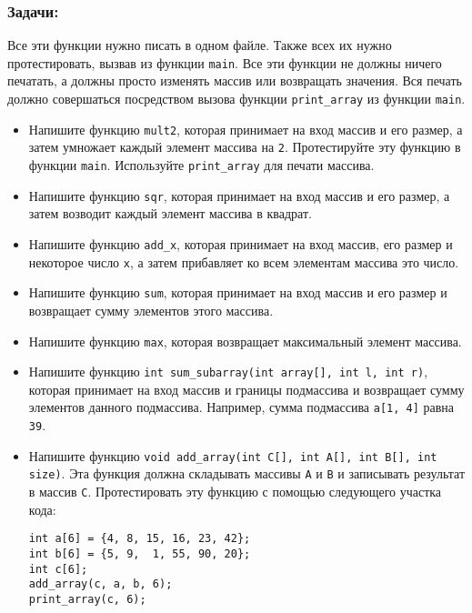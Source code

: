 \documentclass{article}
\begin{document}
\subsubsection*{Задачи:}
Все эти функции нужно писать в одном файле. Также всех их нужно протестировать, вызвав из функции \texttt{main}. Все эти функции не должны ничего печатать, а должны просто изменять массив или возвращать значения. Вся печать должно совершаться посредством вызова функции \texttt{print\_array} из функции \texttt{main}.
\begin{itemize}
\item Напишите функцию \texttt{mult2}, которая принимает на вход массив и его размер, а затем умножает каждый элемент массива на \texttt{2}. Протестируйте эту функцию в функции \texttt{main}. Используйте \texttt{print\_array} для печати массива.
\item Напишите функцию \texttt{sqr}, которая принимает на вход массив и его размер, а затем возводит каждый элемент массива в квадрат.
\item Напишите функцию \texttt{add\_x}, которая принимает на вход массив, его размер и некоторое число \texttt{x}, а затем прибавляет ко всем элементам массива это число.
\item Напишите функцию \texttt{sum}, которая принимает на вход массив и его размер и возвращает сумму элементов этого массива.
\item Напишите функцию \texttt{max}, которая возвращает максимальный элемент массива.
\item Напишите функцию \texttt{int sum\_subarray(int array[], int l, int r)}, которая принимает на вход массив и границы подмассива и возвращает сумму элементов данного подмассива. Например, сумма подмассива \texttt{a[1, 4]} равна \texttt{39}.

\item Напишите функцию \texttt{void add\_array(int C[], int A[], int B[], int size)}. Эта функция должна складывать массивы \texttt{A} и \texttt{B} и записывать результат в массив \texttt{C}. Протестировать эту функцию с помощью следующего участка кода:
\begin{lstlisting}
int a[6] = {4, 8, 15, 16, 23, 42};
int b[6] = {5, 9,  1, 55, 90, 20};
int c[6];
add_array(c, a, b, 6);
print_array(c, 6);
\end{lstlisting}
\end{itemize}
\end{document}

